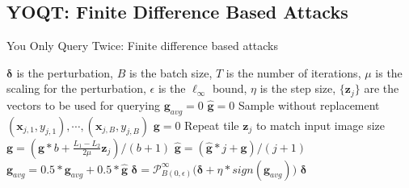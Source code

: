 \documentclass[letterpaper]{article}
\begin{document}
	\subsection{YOQT: Finite Difference Based Attacks}
	
	
	\begin{algorithm*}[t]
		\caption{You Only Query Twice: Finite difference based attacks}
		\label{alg:yoqt}
		\begin{algorithmic}[1]
			\State $\bm{\delta}$ is the perturbation, $B$ is the batch size, $T$ is the number of iterations, $\mu$ is the scaling for the perturbation, $\epsilon$ is the $\ell_{\infty}$ bound, $\eta$ is the step size, $\{\mathbf{z}_j\}$ are the vectors to be used for querying
			\State $\mathbf{g}_{avg}=0$
			\State $\widehat{\mathbf{g}}=0$
			\State Sample without replacement $(\mathbf{x}_{j,1},y_{j,1}),\cdots, (\mathbf{x}_{j,B}, y_{j,B})$
			\State $\mathbf{g}=0$
			\State Repeat tile $\mathbf{z}_j$ to match input image size%
			\State $\mathbf{g} = (\mathbf{g}*b+\frac{L_1 - L_2}{2\mu}\mathbf{z}_j)/(b+1)$
			\EndFor
			\State $\widehat{\mathbf{g}} = (\widehat{\mathbf{g}}*j+\mathbf{g})/(j+1)$
			\EndFor
			\State $\mathbf{g}_{avg}=0.5*\mathbf{g}_{avg}+0.5*\widehat{\mathbf{g}}$ 
			\State $\bm{\delta} = \mathcal{P}_{B(0,\epsilon)}^\infty\Big(\bm{\delta}+\eta*\textit{sign}(\mathbf{g}_{avg})\Big)$
			\EndWhile
			\State \Return $\bm{\delta}$
			\EndProcedure
		\end{algorithmic}
	\end{algorithm*}
	
\end{document}

